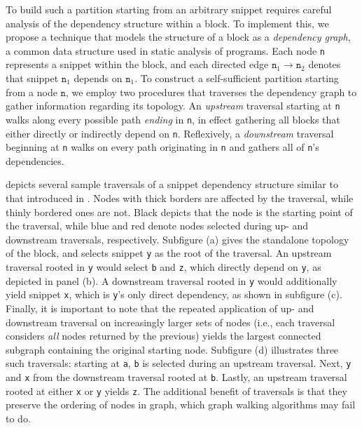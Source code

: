 To build such a partition starting from an arbitrary snippet
requires careful analysis of the dependency structure within a block.
To implement this, we propose a technique that models the
structure of a block as a \textit{dependency graph}, a common
data structure used in static analysis of programs.
Each node \texttt{n} represents a snippet within the block,
and each directed edge $\texttt{n}_1 \to \texttt{n}_2$
denotes that snippet $\texttt{n}_1$ depends on $\texttt{n}_1$.
To construct a self-sufficient partition starting from a node $\texttt{n}$,
we employ two procedures that traverses the dependency graph
to gather information regarding its topology.
An \textit{upstream} traversal starting at \texttt{n} walks
along every possible path \textit{ending} in \texttt{n}, in
effect gathering all blocks that either directly or indirectly depend on \texttt{n}.
Reflexively, a \textit{downstream} traversal beginning at \texttt{n}
walks on every path originating in \texttt{n} and gathers all of \texttt{n}'s
dependencies.

 depicts several sample traversals of a
snippet dependency structure similar to that introduced in .
Nodes with thick borders are affected by the traversal, while thinly bordered ones are not.
Black depicts that the node is the starting point of the traversal,
while blue and red denote nodes selected during up- and downstream traversals, respectively.
Subfigure (a) gives the standalone topology of the block, and selects
snippet \texttt{y} as the root of the traversal.
An upstream traversal rooted in \texttt{y} would select \texttt{b} and \texttt{z},
which directly depend on \texttt{y}, as depicted in panel (b).
A downstream traversal rooted in \texttt{y} would additionally yield
snippet \texttt{x}, which is \texttt{y}'s only direct dependency, as shown in 
subfigure (c).
Finally, it is important to note that the repeated application of up- and downstream
traversal on increasingly larger sets of nodes (i.e., each traversal considers \textit{all}
nodes returned by the previous) yields the largest connected subgraph containing the
original starting node.
Subfigure (d) illustrates three such traversals:
starting at \texttt{a}, \texttt{b} is selected during an upstream traversal.
Next, \texttt{y} and \texttt{x} from the downstream traversal rooted at \texttt{b}.
Lastly, an upstream traversal rooted at either \texttt{x} or \texttt{y} yields \texttt{z}.
The additional benefit of traversals is that they preserve
the ordering of nodes in graph, which graph walking algorithms may fail to do.

